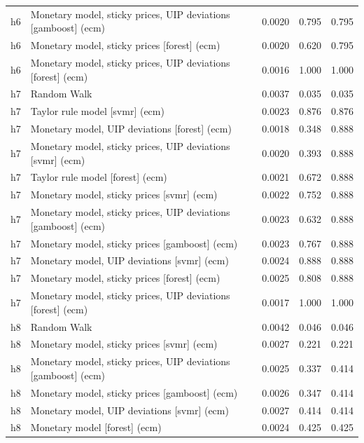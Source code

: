 \begin{ThreePartTable}
\begin{longtable}[t]{cp{5.5cm}ccc}
h6 & \raggedright Monetary model, sticky prices, UIP deviations [gamboost] (ecm) & 0.0020 & 0.795 & 0.795\\
h6 & \raggedright Monetary model, sticky prices [forest] (ecm) & 0.0020 & 0.620 & 0.795\\
h6 & \raggedright Monetary model, sticky prices, UIP deviations [forest] (ecm) & 0.0016 & 1.000 & 1.000\\
\addlinespace
h7 & \raggedright Random Walk & 0.0037 & 0.035 & 0.035\\
h7 & \raggedright Taylor rule model [svmr] (ecm) & 0.0023 & 0.876 & 0.876\\
h7 & \raggedright Monetary model, UIP deviations [forest] (ecm) & 0.0018 & 0.348 & 0.888\\
h7 & \raggedright Monetary model, sticky prices, UIP deviations [svmr] (ecm) & 0.0020 & 0.393 & 0.888\\
h7 & \raggedright Taylor rule model [forest] (ecm) & 0.0021 & 0.672 & 0.888\\
h7 & \raggedright Monetary model, sticky prices [svmr] (ecm) & 0.0022 & 0.752 & 0.888\\
h7 & \raggedright Monetary model, sticky prices, UIP deviations [gamboost] (ecm) & 0.0023 & 0.632 & 0.888\\
h7 & \raggedright Monetary model, sticky prices [gamboost] (ecm) & 0.0023 & 0.767 & 0.888\\
h7 & \raggedright Monetary model, UIP deviations [svmr] (ecm) & 0.0024 & 0.888 & 0.888\\
h7 & \raggedright Monetary model, sticky prices [forest] (ecm) & 0.0025 & 0.808 & 0.888\\
h7 & \raggedright Monetary model, sticky prices, UIP deviations [forest] (ecm) & 0.0017 & 1.000 & 1.000\\
\addlinespace
h8 & \raggedright Random Walk & 0.0042 & 0.046 & 0.046\\
h8 & \raggedright Monetary model, sticky prices [svmr] (ecm) & 0.0027 & 0.221 & 0.221\\
h8 & \raggedright Monetary model, sticky prices, UIP deviations [gamboost] (ecm) & 0.0025 & 0.337 & 0.414\\
h8 & \raggedright Monetary model, sticky prices [gamboost] (ecm) & 0.0026 & 0.347 & 0.414\\
h8 & \raggedright Monetary model, UIP deviations [svmr] (ecm) & 0.0027 & 0.414 & 0.414\\
h8 & \raggedright Monetary model [forest] (ecm) & 0.0024 & 0.425 & 0.425\\

\end{longtable}
\end{ThreePartTable}
